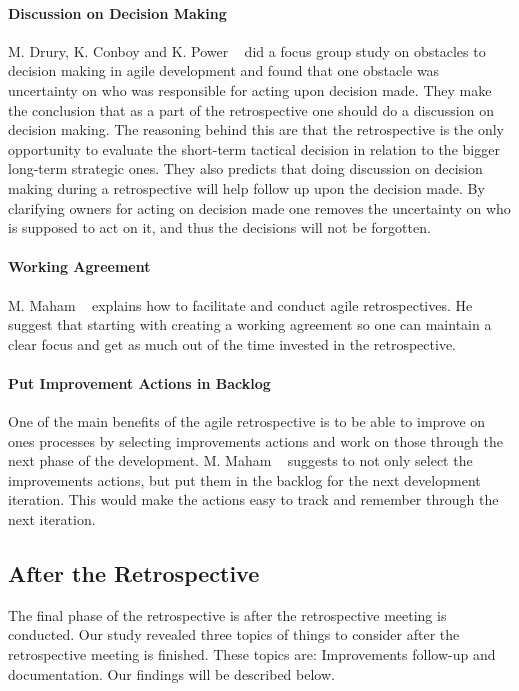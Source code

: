 \documentclass[12pt]{article}
\begin{document}
\paragraph{Discussion on Decision Making}
M. Drury, K. Conboy and K. Power ~\cite{Drury2012} did a focus group study on obstacles to decision making in agile development and found that one obstacle was uncertainty on who was responsible for acting upon decision made. They make the conclusion that as a part of the retrospective one should do a discussion on decision making. The reasoning behind this are that the retrospective is the only opportunity to evaluate the short-term tactical decision in relation to the bigger long-term strategic ones. They also predicts that doing discussion on decision making during a retrospective will help follow up upon the decision made. By clarifying owners for acting on decision made one removes the uncertainty on who is supposed to act on it, and thus the decisions will not be forgotten. 

\paragraph{Working Agreement}
M. Maham ~\cite{Maham2008} explains how to facilitate and conduct agile retrospectives. He suggest that starting with creating a working agreement so one can maintain a clear focus and get as much out of the time invested in the retrospective. 

\paragraph{Put Improvement Actions in Backlog}
One of the main benefits of the agile retrospective is to be able to improve on ones processes by selecting improvements actions and work on those through the next phase of the development. M. Maham ~\cite{Maham2008} suggests to not only select the improvements actions, but put them in the backlog for the next development iteration. This would make the actions easy to track and remember through the next iteration. 

\subsection{After the Retrospective}
The final phase of the retrospective is after the retrospective meeting is conducted. Our study revealed three topics of things to consider after the retrospective meeting is finished. These topics are: Improvements follow-up and documentation. Our findings will be described below.
\end{document}
